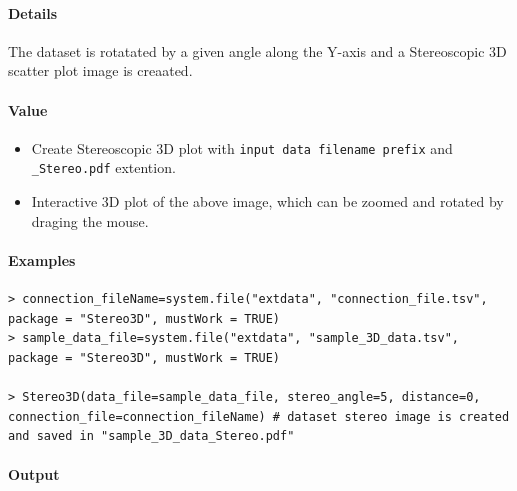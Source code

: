 \documentclass[]{article}
\providecommand{\tightlist}{%
  \setlength{\itemsep}{0pt}\setlength{\parskip}{0pt}}
\let\oldparagraph\paragraph
\renewcommand{\paragraph}[1]{\oldparagraph{#1}\mbox{}}
\begin{document}
\paragraph{\texorpdfstring{\textbf{Details}}{Details}}\label{details}

The dataset is rotatated by a given angle along the Y-axis and a
Stereoscopic 3D scatter plot image is creaated.

\paragraph{\texorpdfstring{\textbf{Value}}{Value}}\label{value}

\begin{itemize}
\tightlist
\item
  Create Stereoscopic 3D plot with
  \texttt{input\ data\ filename\ prefix} and \texttt{\_Stereo.pdf}
  extention.
\item
  Interactive 3D plot of the above image, which can be zoomed and rotated by draging the mouse.
\end{itemize}

\paragraph{\texorpdfstring{\textbf{Examples}}{Examples}}\label{examples}

\begin{verbatim}
> connection_fileName=system.file("extdata", "connection_file.tsv",
package = "Stereo3D", mustWork = TRUE)
> sample_data_file=system.file("extdata", "sample_3D_data.tsv",
package = "Stereo3D", mustWork = TRUE)

> Stereo3D(data_file=sample_data_file, stereo_angle=5, distance=0,
connection_file=connection_fileName) # dataset stereo image is created
and saved in "sample_3D_data_Stereo.pdf"
\end{verbatim}

\paragraph{Output}\label{output}
\end{document}
